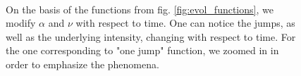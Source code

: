\documentclass[11pt]{book}
\begin{document}
\begin{figure}
\centering
{} 
\\

\caption{On the basis of the functions from fig. \ref{fig:evol_functions}, we modify $\alpha$ and $\nu$ with respect to time. One can notice the jumps, as well as the underlying intensity, changing with respect to time. For the one corresponding to "one jump" function, we zoomed in in order to emphasize the phenomena.}
\label{fig:param_dep_hawkes}
\end{figure}
\end{document}
